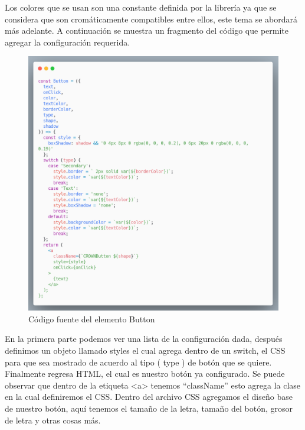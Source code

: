 \newline
Los colores que se usan son una constante definida por la librería ya que se considera que son cromáticamente compatibles entre ellos, este tema se abordará más adelante.
A continuación se muestra un fragmento del código que permite agregar la configuración requerida.
\newline
\newline
\begin{figure}[H]
    \includegraphics[width=1\textwidth]{./Imagenes/carbon-9.png}
    \caption[Código fuente del elemento Button]{Código fuente del elemento Button}
    \end{figure}
\newline
\newline
En la primera parte podemos ver una lista de la configuración dada,  después definimos un objeto llamado styles el cual agrega dentro de un switch, el CSS para que sea mostrado de acuerdo al tipo ( type ) de botón que se quiere. Finalmente regresa HTML, el cual es nuestro botón ya configurado.
Se puede observar que dentro de la etiqueta <a>  tenemos “className” esto agrega la clase en la cual definiremos el CSS.
Dentro del archivo CSS agregamos el diseño base de nuestro botón, aquí tenemos el  tamaño de la letra, tamaño del botón, grosor de letra y otras cosas más.
\newline
